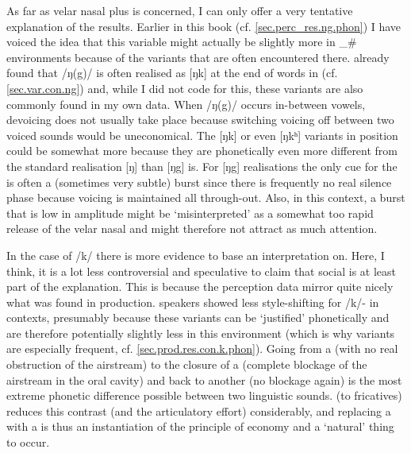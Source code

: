As far as velar nasal plus is concerned, I can only offer a very tentative explanation of the results.
Earlier in this book (cf. \ref{sec.perc_res.ng.phon}) I have voiced the idea that this variable might actually be slightly more  in \_\# environments because of the variants that are often encountered there.
\textcite{knowles1973} already found that /ŋ(g)/ is often realised as [ŋk] at the end of words in  (cf. \ref{sec.var.con.ng}) and, while I did not code for this, these variants are also commonly found in my own data.
When /ŋ(g)/ occurs in-between vowels, devoicing does not usually take place because switching voicing off between two voiced sounds would be uneconomical.
The [ŋk] or even [ŋkʰ] variants in  position could be somewhat more  because they are phonetically even more different from the standard realisation [ŋ] than [ŋg] is.
For  [ŋg] realisations the only cue for the  is often a (sometimes very subtle) burst since there is frequently no real silence phase because voicing is maintained all through-out.
Also, in this context, a burst that is low in amplitude might be `misinterpreted' as a somewhat too rapid release of the velar nasal and might therefore not attract as much attention.

In the case of /k/  there is more evidence to base an interpretation on.
Here, I think, it is a lot less controversial and speculative to claim that social  is at least part of the explanation.
This is because the perception data mirror quite nicely what was found in production.
 speakers showed less style-shifting for /k/- in  contexts, presumably because these variants can be `justified' phonetically and are therefore potentially slightly less  in this environment (which is why  variants are especially frequent, cf. \ref{sec.prod.res.con.k.phon}).
Going from a  (with no real obstruction of the airstream) to the closure of a  (complete blockage of the airstream in the oral cavity) and back to another  (no blockage again) is the most extreme phonetic difference possible between two linguistic sounds.
 (to fricatives) reduces this contrast (and the articulatory effort) considerably, and replacing a  with a  is thus an instantiation of the principle of economy and a `natural' thing to occur.


